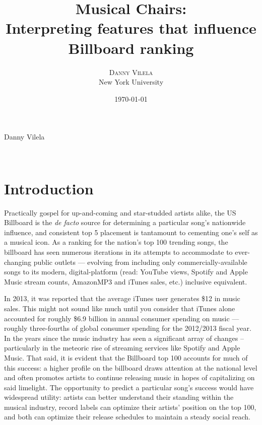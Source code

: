 \documentclass[11pt]{article} %
\title{\textbf{Musical Chairs:}\\ 
\vspace*{0.25em} %
Interpreting features that influence Billboard ranking} %
\author{\textsc{Danny Vilela} %
\\{New York University}} %
\date{\today} %
\makeatletter
\renewcommand{\maketitle}{ %
\begin{flushright} %
{\LARGE\@title} %

\vspace{20pt} %

{\large\@author} %
\\\@date %

\vspace{20pt} %
\end{flushright}
}
\makeatother
\begin{document}
\vspace*{\fill}
\begin{center}
	Danny Vilela
\end{center}
\vspace*{\fill}

\newpage


\maketitle %


\section*{Introduction}

Practically gospel for up-and-coming and star-studded artists alike, the US Billboard is the \textit{de facto} source for determining a particular song's nationwide influence, and consistent top 5 placement is tantamount to cementing one's self as a musical icon. As a ranking for the nation's top 100 trending songs, the billboard has seen numerous iterations in its attempts to accommodate to ever-changing public outlets --- evolving from including only commercially-available songs to its modern, digital-platform (read: YouTube views, Spotify and Apple Music stream counts, AmazonMP3 and iTunes sales, etc.) inclusive equivalent. \par

In 2013, it was reported that the average iTunes user generates \$12 in music sales. This might not sound like much until you consider that iTunes alone accounted for roughly \$6.9 billion in annual consumer spending on music --- roughly three-fourths of global consumer spending for the 2012/2013 fiscal year. In the years since the music industry has seen a significant array of changes -- particularly in the meteoric rise of streaming services like Spotify and Apple Music. That said, it is evident that the Billboard top 100 accounts for much of this success: a higher profile on the billboard draws attention at the national level and often promotes artists to continue releasing music in hopes of capitalizing on said limelight. The opportunity to predict a particular song's success would have widespread utility: artists can better understand their standing within the musical industry, record labels can optimize their artists' position on the top 100, and both can optimize their release schedules to maintain a steady social reach. \par
\end{document}

